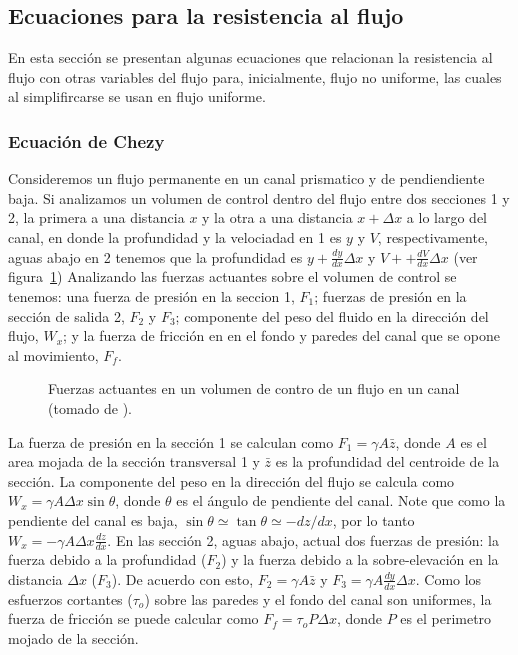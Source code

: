 \documentclass[11pt, oneside]{article}
\begin{document}
\subsection{Ecuaciones para la resistencia al flujo}
En esta secci\'on se presentan algunas ecuaciones que relacionan la resistencia al flujo con otras variables del flujo para, inicialmente, flujo no uniforme, las cuales al simplifircarse se usan en flujo uniforme. 

\subsubsection{Ecuaci\'on de Chezy}
Consideremos un flujo permanente en un canal prismatico y de pendiendiente baja. Si analizamos un volumen de control dentro del flujo entre dos secciones 1 y 2, la primera a una distancia $x$ y la otra a una distancia $x + \Delta x$ a lo largo del canal, en donde la profundidad y la velociadad en 1 es $y$ y $V$, respectivamente, aguas abajo en 2 tenemos que la profundidad es $y + \frac{dy}{dx} \Delta x$ y $V + + \frac{dV}{dx} \Delta x$ (ver figura~\ref{fig2}) Analizando las fuerzas actuantes sobre el volumen de control se tenemos: una fuerza de presi\'on en la seccion 1, $F_1$; fuerzas de presi\'on en la secci\'on de salida 2, $F_2$ y $F_3$; componente del peso del fluido en la direcci\'on del flujo, $W_x$; y la fuerza de fricci\'on en en el fondo y paredes del canal que se opone al movimiento, $F_f$. 

\begin{figure}[h]
\centering
\caption{Fuerzas actuantes en un volumen de contro de un flujo en un canal (tomado de \cite{Chau}).}
\label{fig2}
\end{figure}

La  fuerza de presi\'on en la secci\'on 1 se calculan como $F_1 = \gamma A \bar{z}$, donde $A$ es el area mojada de la secci\'on transversal 1 y $\bar{z}$ es la profundidad del centroide de la secci\'on. La componente del peso en la direcci\'on del flujo se calcula como $W_x = \gamma A \Delta x \sin \theta$, donde $\theta$ es el \'angulo de pendiente del canal. Note que como la pendiente del canal es baja, $\sin \theta \simeq \tan \theta \simeq  -dz/dx$, por lo tanto $W_x = -\gamma A \Delta x \frac{dz}{dx}$. En las secci\'on 2, aguas abajo, actual dos fuerzas de presi\'on: la fuerza debido a la profundidad ($F_2$) y la fuerza debido a la sobre-elevaci\'on en la distancia $\Delta x$ ($F_3$). De acuerdo con esto, $F_2 = \gamma A \bar{z}$ y $F_3 = \gamma A \frac{dy}{dx} \Delta x$. Como los esfuerzos cortantes ($\tau_o$) sobre las paredes y el fondo del canal son uniformes, la fuerza de fricci\'on se puede calcular como $F_f = \tau_o P \Delta x$, donde $P$ es el perimetro mojado de la secci\'on. 
\end{document}

